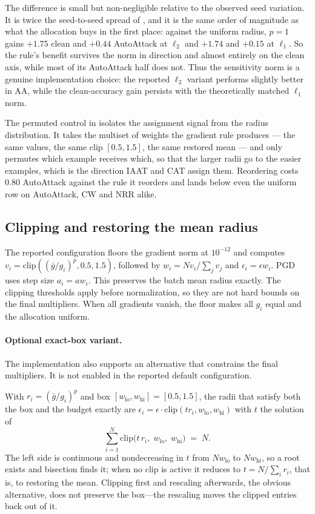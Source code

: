The difference is small but non-negligible relative to the observed seed variation. It is twice the seed-to-seed spread of , and it is the same
order of magnitude as what the allocation buys in the first place: against the uniform radius, $p = 1$
gains $+1.75$ clean and $+0.44$ AutoAttack at $\ell_2$ and $+1.74$ and $+0.15$ at $\ell_1$. So the
rule's benefit survives the norm in direction and almost entirely on the clean axis, while most of its
AutoAttack half does not. Thus the sensitivity norm is a genuine implementation choice: the reported $\ell_2$ variant performs slightly better in AA, while the clean-accuracy gain persists with the theoretically matched $\ell_1$ norm.

The permuted control in  isolates the assignment signal from the radius distribution. It takes the multiset of weights the
gradient rule produces --- the same values, the same clip $[0.5, 1.5]$, the same restored mean --- and
only permutes which example receives which, so that the larger radii go to the easier examples, which
is the direction IAAT and CAT assign them. Reordering costs $0.80$ AutoAttack against the rule it
reorders and lands below even the uniform row on AutoAttack, CW and NRR alike.

\subsection{Clipping and restoring the mean radius}

The reported configuration floors the gradient norm at $10^{-12}$ and computes
$v_i=\mathrm{clip}((\bar g/g_i)^p,0.5,1.5)$, followed by
$w_i=Nv_i/\sum_jv_j$ and $\epsilon_i=\epsilon w_i$. PGD uses step size $a_i=aw_i$.
This preserves the batch mean radius exactly. The clipping thresholds apply before normalization,
so they are not hard bounds on the final multipliers. When all gradients vanish, the floor makes all
$g_i$ equal and the allocation uniform.

\paragraph{Optional exact-box variant.}
The implementation also supports an alternative that constrains the final multipliers. It is not
enabled in the reported default configuration.

With $r_i = (\bar g / g_i)^p$ and box $[w_{\mathrm{lo}}, w_{\mathrm{hi}}] = [0.5, 1.5]$, the radii that
satisfy both the box and the budget exactly are $\epsilon_i = \epsilon \cdot \mathrm{clip}(t r_i,
w_{\mathrm{lo}}, w_{\mathrm{hi}})$ with $t$ the solution of
\begin{equation}
\sum_{i=1}^{N} \mathrm{clip}\big(t\, r_i,\; w_{\mathrm{lo}},\; w_{\mathrm{hi}}\big) \;=\; N .
\label{eqn:box}
\end{equation}
The left side is continuous and nondecreasing in $t$ from $N w_{\mathrm{lo}}$ to $N w_{\mathrm{hi}}$,
so a root exists and bisection finds it; when no clip is active it reduces to $t = N / \sum_i r_i$,
that is, to restoring the mean. Clipping first and rescaling afterwards, the obvious alternative, does
not preserve the box---the rescaling moves the clipped entries back out of it.

